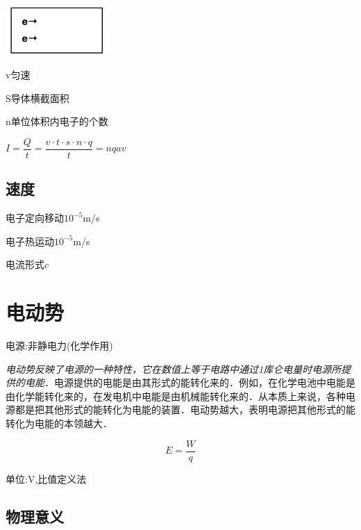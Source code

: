 \documentclass[10pt,cn]{elegantbook}
\begin{document}
      \begin{center}
     	\includegraphics[max width=0.3\textwidth]{image/20240708-3.jpg}
     \end{center}
     
    v匀速
    
    S导体横截面积
    
    n单位体积内电子的个数
    
    $I=\dfrac{Q}{t}=\dfrac{v\cdot t\cdot s\cdot n\cdot q}{t}=nqav$
    
    	\begin{center}
    \end{center}
    
    \subsection{速度}
    
    电子定向移动$10^{-5}$m/s
    
    电子热运动$10^{-5}$m/s
    
    电流形式$c$
    
    \section{电动势}
    
    电源:非静电力(化学作用)
    
    \textit{电动势反映了电源的一种特性，它在数值上等于电路中通过1库仑电量时电源所提供的电能}．电源提供的电能是由其形式的能转化来的．例如，在化学电池中电能是由化学能转化来的，在发电机中电能是由机械能转化来的．从本质上来说，各种电源都是把其他形式的能转化为电能的装置．电动势越大，表明电源把其他形式的能转化为电能的本领越大．
    
    $$E=\dfrac{W}{q}$$
    
    单位:V,比值定义法
    
    \subsection{物理意义}
    
\end{document}
